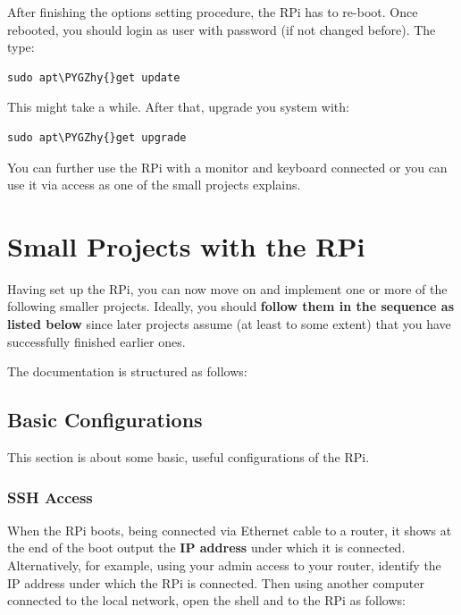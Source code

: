 \documentclass[letterpaper,10pt,english]{sphinxmanual}
\def\PYGZhy{\char`\-}
\begin{document}
After finishing the options setting procedure, the RPi has to re-boot. Once rebooted, you should login as user  with password  (if not changed before). The type:

\begin{Verbatim}[commandchars=\\\{\}]
sudo apt\PYGZhy{}get update
\end{Verbatim}

This might  take a while. After that, upgrade you system with:

\begin{Verbatim}[commandchars=\\\{\}]
sudo apt\PYGZhy{}get upgrade
\end{Verbatim}

You can further use the RPi with a monitor and keyboard connected or you can use it via  access as one of the small projects explains.


\chapter{Small Projects with the RPi}
\label{index:small-projects-with-the-rpi}
Having set up the RPi, you can now move on and implement one or more of the following smaller projects. Ideally, you should \textbf{follow them in the sequence as listed below} since later projects assume (at least to some extent) that you have successfully finished earlier ones.

The documentation is structured as follows:


\section{Basic Configurations}
\label{00_basic_config:basic-configurations}\label{00_basic_config::doc}
This section is about some basic, useful configurations of the RPi.


\subsection{SSH Access}
\label{00_basic_config:ssh-access}
When the RPi boots, being connected via Ethernet cable to a router, it shows at the end of the boot output the \textbf{IP address} under which it is connected. Alternatively, for example, using your admin access to your router, identify the IP address under which the RPi is connected. Then using another computer connected to the local network, open the shell and  to the RPi as follows:
\end{document}
